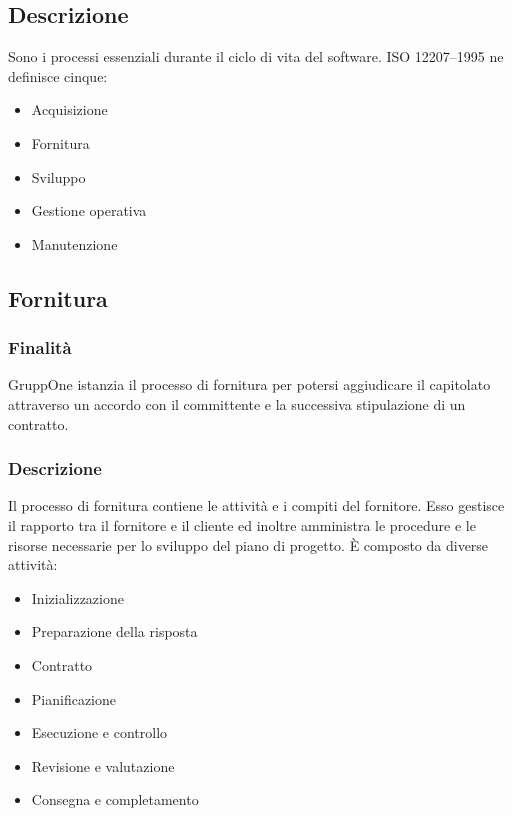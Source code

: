 \documentclass[../norme-di-progetto.tex]{subfiles}
\begin{document}
\subsection{Descrizione}%
\label{sub:processi_primari/descrizione}
Sono i processi essenziali durante il ciclo di vita del software. ISO 12207--1995 ne definisce cinque:

\begin{itemize}
  \item Acquisizione
  \item Fornitura
  \item Sviluppo
  \item Gestione operativa
  \item Manutenzione
\end{itemize}

\subsection{Fornitura}%
\label{sub:fornitura}

\subsubsection{Finalità}%
\label{subs:fornitura/finalita}

GruppOne istanzia il processo di fornitura per potersi aggiudicare il capitolato attraverso un accordo con il committente e la successiva stipulazione di un contratto.

\subsubsection{Descrizione}%
\label{subs:fornitura/descrizione}

Il processo di fornitura contiene le attività e i compiti del fornitore. Esso gestisce il rapporto tra il fornitore e il cliente ed inoltre amministra le procedure e le risorse necessarie per lo sviluppo del piano di progetto. È composto da diverse attività:

\begin{itemize}
  \item Inizializzazione
  \item Preparazione della risposta
  \item Contratto
  \item Pianificazione
  \item Esecuzione e controllo
  \item Revisione e valutazione
  \item Consegna e completamento
\end{itemize}
\end{document}
